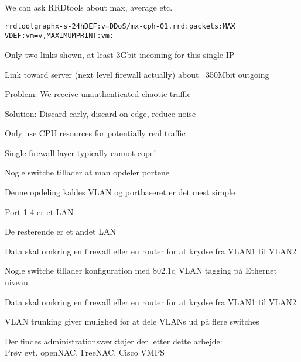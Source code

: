 \documentclass[20pt,landscape,a4paper,footrule]{foils}
\begin{document}
We can ask RRDtools about max, average etc.
\begin{alltt}\small
rrdtool graph x -s -24h DEF:v=DDoS/mx-cph-01.rrd:packets:MAX
VDEF:vm=v,MAXIMUM PRINT:vm:%.lf
\end{alltt}





\centerline{Only two links shown, at least 3Gbit incoming for this single IP}

\centerline{Link toward server (next level firewall actually) about ~350Mbit outgoing}

\begin{list1}
\item Problem: We receive unauthenticated chaotic traffic

\item Solution: Discard early, discard on edge, reduce noise

\item Only use CPU resources for potentially real traffic
\end{list1}

\centerline{Single firewall layer typically cannot cope!}





\begin{list1}
\item Nogle switche tillader at man opdeler portene
\item Denne opdeling kaldes VLAN og portbaseret er det mest simple
\item Port 1-4 er et LAN
\item De resterende er et andet LAN
\item Data skal omkring en firewall eller en router for at krydse fra VLAN1 til VLAN2
\end{list1}



\begin{list1}
\item Nogle switche tillader konfiguration med 802.1q VLAN tagging på Ethernet niveau
\item Data skal omkring en firewall eller en router for at krydse fra VLAN1 til VLAN2
\item VLAN trunking giver mulighed for at dele VLANs ud på flere switches
\item Der findes administrationsværktøjer der letter dette arbejde: \\
Prøv evt. openNAC, FreeNAC, Cisco VMPS
\end{list1}
\end{document}

